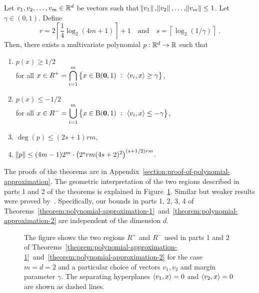 \begin{theorem}
\label{theorem:polynomial-approximation-2}
Let $v_1, v_2, \dots, v_m \in \mathbb{R}^d$ be vectors such that $\norm{v_1},
\norm{v_2}, \dots, \norm{v_m} \le 1$. Let $\gamma \in (0,1)$.
Define
$$
r = 2 \left\lceil \frac{1}{4} \log_2(4m + 1) \right\rceil + 1 \quad \text{and} \quad s = \left \lceil \log_2(1/\gamma) \right \rceil \; .
$$
Then, there exists a multivariate polynomial $p:\mathbb{R}^d \to \mathbb{R}$ such that
\begin{enumerate}
\item $\displaystyle p(x) \ge 1/2$ \\
for all $\displaystyle x \in R^+ = \bigcap_{i=1}^m \left\{ x \in \operatorname{B}(\mathbf{0},1) ~:~ \left\langle v_i, x \right\rangle \ge \gamma \right\}$,

\item $\displaystyle p(x) \le - 1/2$ \\
for all $\displaystyle x \in R^- = \bigcup_{i=1}^m \left\{ x \in \operatorname{B}(\mathbf{0},1) ~:~ \left\langle v_i, x \right\rangle \le - \gamma \right\}$,

\item $\deg(p) \le (2s+1) rm$,
\item $\norm{p} \le (4m-1) 2^m \cdot \left(2^s rm (4s+2)^2 \right)^{(s+1/2)rm}$.
\end{enumerate}
\end{theorem}

The proofs of the theorems are in
Appendix~\ref{section:proof-of-polynomial-approximation}.
The geometric interpretation of the two regions described in parts 1
and 2 of the theorems is explained in Figure~\ref{figure:pizza-slice}. Similar
but weaker results were proved by~\citet{Klivans-Servedio-2008}. Specifically,
our bounds in parts 1, 2, 3, 4 of
Theorems~\ref{theorem:polynomial-approximation-1}~and~\ref{theorem:polynomial-approximation-2}
are independent of the dimension $d$.

\begin{figure}
\begin{center}
 \scalebox{.65}{}
\end{center}
\caption[]{The figure shows the two regions $R^+$ and $R^-$ used in parts 1 and
2 of
Theorems~\ref{theorem:polynomial-approximation-1}~and~\ref{theorem:polynomial-approximation-2}
for the case $m=d=2$ and a particular choice of vectors $v_1, v_2$ and margin
parameter $\gamma$. The separating hyperplanes $\left\langle v_1, x \right\rangle = 0$ and
$\left\langle v_2, x \right\rangle = 0$ are shown as dashed lines.}
\label{figure:pizza-slice}
\end{figure}

